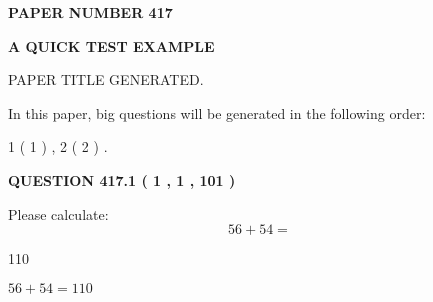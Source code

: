 \documentclass[12pt]{article}
\begin{document}
   
   
   
\newpage 
\setcounter{page}{ 
   417001 } 
   
   
   
   
 {\textbf{ \Large{ PAPER NUMBER  417  }}}
   
   
\vspace{0.2in}
   
   
   
   
   
   
   
   
 \vspace{0.2in}
{\LARGE {\textbf{ A QUICK TEST EXAMPLE}}}
   
   
 PAPER TITLE GENERATED.
   
   
   
\vspace{0.2in}
   
In this paper, big questions will be generated in the following order: 
   
   
   1 ( 1 )
 ,
   2 ( 2 )
 .
  
\vspace{0.2in}
  
{\textbf{\Large{QUESTION
417.1 
 ( 1 , 1 , 101 )
}}}
  
  
 
Please calculate:
\begin{equation}
56 +  %
54 = \nonumber
\end{equation}
 
 
 
\noindent{}
 
 

110
 
 
\noindent{}
 
 

 
 
 
\noindent{}
 
 

$ %
56 +  %
54=   %
110$
 
 
\noindent{}
 
 

 
   
\end{document}
